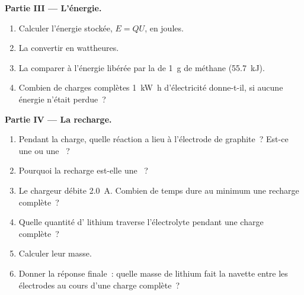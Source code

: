 \begin{problem}
\medskip
\noindent\textbf{Partie III --- L'énergie.}
\begin{enumerate}[resume]
  \item Calculer l'énergie stockée, $E = Q U$, en joules.
  \item La convertir en wattheures.
  \item La comparer à l'énergie libérée par la  de
        \qty{1}{g} de méthane
        (\qty{55.7}{kJ}).
  \item Combien de charges complètes \qty{1}{kW.h} d'électricité
        donne-t-il, si aucune énergie n'était perdue~?
\end{enumerate}

\medskip
\noindent\textbf{Partie IV --- La recharge.}
\begin{enumerate}[resume]
  \item Pendant la charge, quelle réaction a lieu à l'électrode de
        graphite~? Est-ce une  ou une ~?
  \item Pourquoi la recharge est-elle une ~?
  \item Le chargeur débite \qty{2.0}{A}. Combien de temps dure au minimum
        une recharge complète~?
  \item Quelle quantité d' lithium traverse l'électrolyte pendant une
        charge complète~?
  \item Calculer leur masse.
  \item Donner la réponse finale~: quelle masse de lithium fait la
        navette entre les électrodes au cours d'une charge complète~?
\end{enumerate}
\end{problem}
